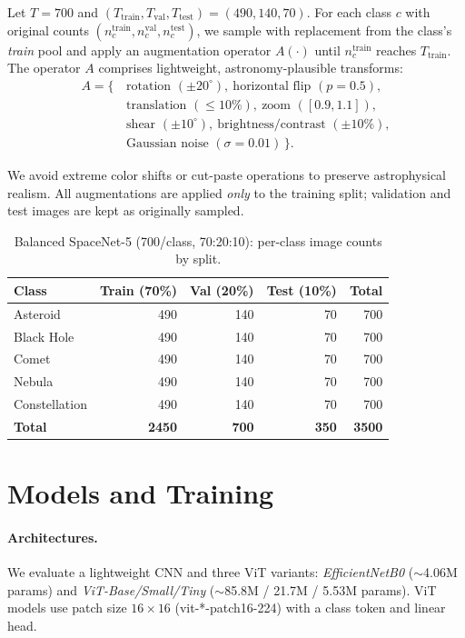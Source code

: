 Let $T{=}700$ and $(T_{\text{train}},T_{\text{val}},T_{\text{test}}){=}(490,140,70)$. For each class $c$ with original counts $(n_c^{\text{train}}, n_c^{\text{val}}, n_c^{\text{test}})$, we sample with replacement from the class’s \emph{train} pool and apply an augmentation operator $A(\cdot)$ until $n_c^{\text{train}}$ reaches $T_{\text{train}}$. The operator $A$ comprises lightweight, astronomy-plausible transforms:
\[
\begin{aligned}
A = \{\, & \text{rotation }(\pm 20^\circ),\ \text{horizontal flip }(p{=}0.5), \\
         & \text{translation }(\leq 10\%),\ \text{zoom }([0.9, 1.1]), \\
         & \text{shear }(\pm 10^\circ),\ \text{brightness/contrast }(\pm 10\%), \\
         & \text{Gaussian noise }(\sigma{=}0.01)\, \}.
\end{aligned}
\]

We avoid extreme color shifts or cut-paste operations to preserve astrophysical realism. All augmentations are applied \emph{only} to the training split; validation and test images are kept as originally sampled.

\begin{table}[!t]
\centering
\caption{Balanced SpaceNet-5 (700/class, 70:20:10): per-class image counts by split.}
\begin{tabular}{lrrrr}
\toprule
\textbf{Class} & \textbf{Train (70\%)} & \textbf{Val (20\%)} & \textbf{Test (10\%)} & \textbf{Total} \\
\midrule
Asteroid       & 490 & 140 & 70 & 700 \\
Black Hole     & 490 & 140 & 70 & 700 \\
Comet          & 490 & 140 & 70 & 700 \\
Nebula         & 490 & 140 & 70 & 700 \\
Constellation  & 490 & 140 & 70 & 700 \\
\midrule
\textbf{Total} & \textbf{2450} & \textbf{700} & \textbf{350} & \textbf{3500} \\
\bottomrule
\end{tabular}
\label{tab:balanced_counts}
\end{table}

\section{Models and Training}

\paragraph*{Architectures.}
We evaluate a lightweight CNN and three ViT variants:
\emph{EfficientNetB0} ($\sim$4.06M params) and \emph{ViT-Base/Small/Tiny} ($\sim$85.8M / 21.7M / 5.53M params).
ViT models use patch size $16\times16$ (vit-*-patch16-224) with a class token and linear head.

